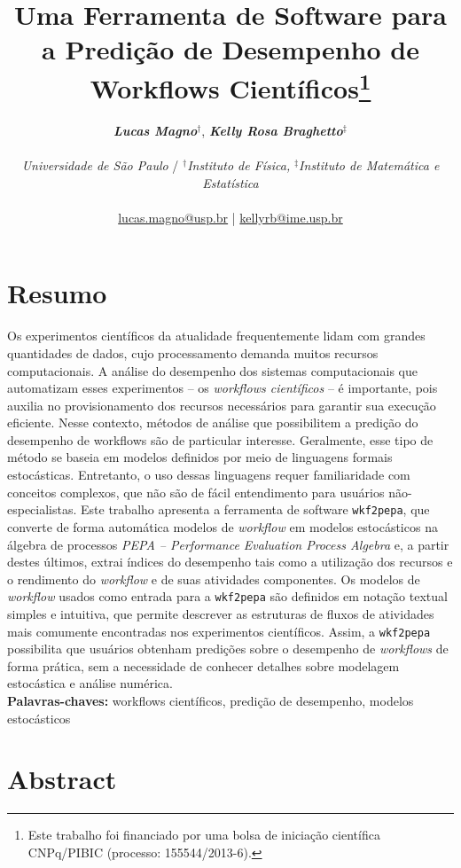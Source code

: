 \documentclass[a4paper,10pt]{article}
\date{}
\title{
    Uma Ferramenta de Software para a Predição de Desempenho de Workflows Científicos\footnote{Este trabalho foi financiado por uma bolsa de iniciação científica CNPq/PIBIC (processo: 155544/2013-6).}
}
\author{
\textbf{\textit{Lucas Magno}}$^\dagger$,\textbf{ \textit{Kelly Rosa Braghetto}}$^\ddagger$\\
\\
\textit{Universidade de São Paulo} / $^\dagger$\textit{Instituto de Física,} $^\ddagger$\textit{Instituto de Matemática e Estatística}\\
\\
\href{mailto:lucas.magno@usp.br}{lucas.magno@usp.br} | \href{mailto:kellyrb@ime.usp.br}{kellyrb@ime.usp.br}
}
\begin{document}
\parindent=0mm

    \maketitle

\vspace{-0.5cm}

    \section*{Resumo}

Os experimentos científicos da atualidade frequentemente lidam com grandes quantidades de dados, cujo processamento demanda muitos recursos computacionais. A análise do desempenho dos sistemas computacionais que automatizam esses experimentos -- os \textit{workflows científicos} -- é importante, pois auxilia no provisionamento dos recursos necessários para garantir sua execução eficiente. Nesse contexto, métodos de análise que possibilitem a predição do desempenho de workflows são de particular interesse. Geralmente, esse tipo de método se baseia em modelos definidos por meio de linguagens formais estocásticas. Entretanto, o uso dessas linguagens requer familiaridade com conceitos complexos, que não são de fácil entendimento para usuários não-especialistas. Este trabalho apresenta a ferramenta de software \texttt{wkf2pepa}, que converte de forma autom\'atica modelos de \emph{workflow} em modelos estocásticos na álgebra de processos \emph{PEPA -- Performance Evaluation Process Algebra} e, a partir destes \'ultimos, extrai índices do desempenho tais como a utilização dos recursos e o rendimento do \emph{workflow} e de suas atividades componentes. Os modelos de \emph{workflow} usados como entrada para a \texttt{wkf2pepa} são definidos em notaç\~ao textual simples e intuitiva, que permite descrever as estruturas de fluxos de atividades mais comumente encontradas nos experimentos cient\'ificos. Assim, a \texttt{wkf2pepa} possibilita que usuários obtenham predições sobre o desempenho de \emph{workflows} de forma prática, sem a necessidade de conhecer detalhes sobre modelagem estocástica e análise numérica.\\

\noindent \textbf{Palavras-chaves:} workflows científicos, predição de desempenho, modelos estocásticos

    \section*{Abstract}
\end{document}
